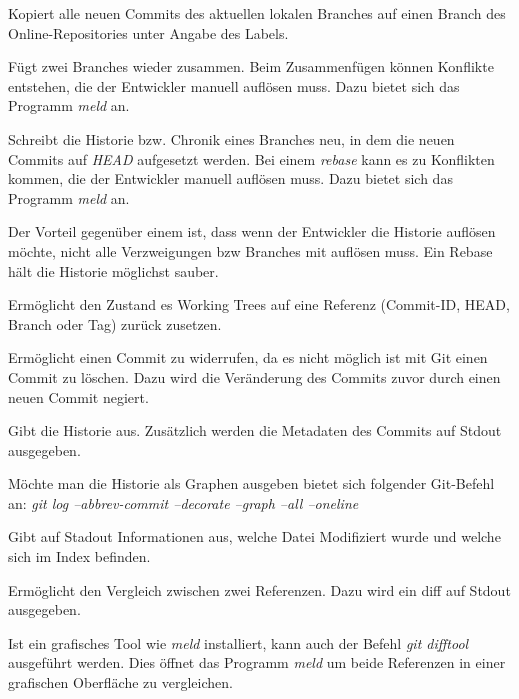 \label{git-commands.advanced.push}
Kopiert alle neuen Commits des aktuellen lokalen Branches auf einen Branch des Online-Repositories unter Angabe des Labels.

\label{git-commands.advanced.merge}
Fügt zwei Branches wieder zusammen. Beim Zusammenfügen können Konflikte entstehen, die der Entwickler manuell auflösen muss. Dazu bietet sich das Programm \textit{meld} an.

\label{git-commands.advanced.rebase}
Schreibt die Historie bzw. Chronik eines Branches neu, in dem die neuen Commits auf \textit{HEAD} aufgesetzt werden. Bei einem \textit{rebase} kann es zu Konflikten kommen, die der Entwickler manuell auflösen muss. Dazu bietet sich das Programm \textit{meld} an. 

Der Vorteil gegenüber einem \textit{} ist, dass wenn der Entwickler die Historie auflösen möchte, nicht alle Verzweigungen bzw Branches mit auflösen muss. Ein Rebase hält die Historie möglichst sauber.

\label{git-commands.advanced.reset}
Ermöglicht den Zustand es Working Trees auf eine Referenz (Commit-ID, HEAD, Branch oder Tag) zurück zusetzen.

\label{git-commands.advanced.revert}
Ermöglicht einen Commit zu widerrufen, da es nicht möglich ist mit Git einen Commit zu löschen. Dazu wird die Veränderung des Commits zuvor durch einen neuen Commit negiert.

\label{git-commands.advanced.log}
Gibt die Historie aus. Zusätzlich werden die Metadaten des Commits auf Stdout ausgegeben. 

\begin{INFO}
  Möchte man die Historie als Graphen ausgeben bietet sich folgender Git-Befehl an: \textit{git log --abbrev-commit --decorate --graph --all --oneline}
\end{INFO}

\label{git-commands.advanced.status}
Gibt auf Stadout Informationen aus, welche Datei Modifiziert wurde und welche sich im Index befinden.

\label{git-commands.advanced.diff}
Ermöglicht den Vergleich zwischen zwei Referenzen. Dazu wird ein diff auf Stdout ausgegeben.

\begin{INFO}
  Ist ein grafisches Tool wie \textit{meld} installiert, kann auch der Befehl \textit{git difftool} ausgeführt werden. Dies öffnet das Programm \textit{meld} um beide Referenzen in einer grafischen Oberfläche zu vergleichen.
\end{INFO}